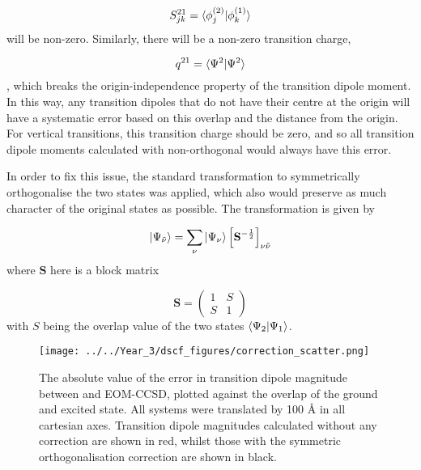 \begin{equation}
S^{21}_{jk} = \braket{\phi_j^{\left(2\right)} | \phi_k^{\left(1\right)}}
\end{equation}
%
will be non-zero. Similarly, there will be a non-zero transition charge,

\begin{equation}
q^{21} = \braket{\Psi^2|\Psi^2}
\end{equation}
%
, which breaks the origin-independence property of the transition dipole moment. In
this way, any transition dipoles that do not have their centre at the origin will
have a systematic error based on this overlap and the distance from the origin.
For vertical transitions, this transition charge should be zero, and so all transition
dipole moments calculated with non-orthogonal \dscf would always have this error.

In order to fix this issue, the standard transformation to symmetrically orthogonalise 
the two states was applied, which also would preserve as much character of the 
original states as possible. The transformation is given by

\begin{equation}
\ket{\Psi_{\tilde{\nu}}} = \sum_{\nu} \ket{\Psi_\nu} \left[\mathbf{S}^{-\frac{1}{2}} \right]_{\nu\tilde{\nu}}
\end{equation}
%
where $\mathbf{S}$ here is a block matrix

\begin{equation}
\mathbf{S} = \begin{pmatrix}
    1 & S \\
    S & 1 
\end{pmatrix}
\end{equation}
%
with $S$ being the overlap value of the two states $\braket{\Psi_2|\Psi_1}$.

\begin{figure}
\centering
\texttt{[image: ../../Year\_3/dscf\_figures/correction\_scatter.png]}
\label{fig:correction_scatter}
\caption{The absolute value of the error in transition dipole magnitude between
\dscf and EOM-CCSD, plotted against the \dscf overlap of the ground and excited
state. All systems were translated by 100 \AA{} in all cartesian axes. Transition
dipole magnitudes calculated without any correction are shown in red, whilst
those with the symmetric orthogonalisation correction are shown in black.}
\end{figure}

